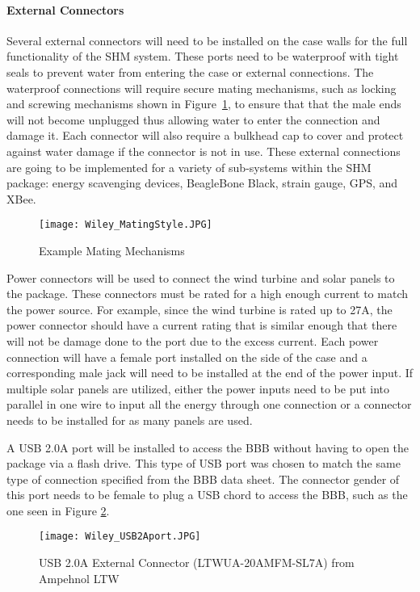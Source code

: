 \paragraph{External Connectors} 
Several external connectors will need to be installed on the case walls for the full functionality of the SHM system. These ports need to be waterproof
with tight seals to prevent water from entering the case or external connections. The waterproof connections will require secure mating mechanisms, such
as locking and screwing mechanisms shown in Figure~\ref{fig:BowChicaWowWow}, to ensure that that the male ends will not become unplugged thus allowing
water to enter the connection and damage it. Each connector will also require a bulkhead cap to cover and protect against water damage if the
connector is not in use. These external connections are going to be implemented for a variety of sub-systems within the SHM package: energy
scavenging devices, BeagleBone Black, strain gauge, GPS, and XBee.
\begin{figure}[h]
\centering
\texttt{[image: Wiley\_MatingStyle.JPG]}
\caption{\label{fig:BowChicaWowWow} Example Mating Mechanisms}
\end{figure}

Power connectors will be used to connect the wind turbine and solar panels to the package. These connectors must be rated for a high enough current to
match the power source. For example, since the wind turbine is rated up to 27A, the power connector should have a current rating that is similar enough
that there will not be damage done to the port due to the excess current. Each power connection will have a female port installed on the side of the
case and a corresponding male jack will need to be installed at the end of the power input. If multiple solar panels are utilized, either the power
inputs need to be put into parallel in one wire to input all the energy through one connection or a connector needs to be installed for as many panels
are used. 

A USB 2.0A port will be installed to access the BBB without having to open the package via a flash drive. This type of USB port was chosen to match the
same type of connection specified from the BBB data sheet. The connector gender of this port needs to be female to plug a USB chord to access the BBB,
such as the one seen in Figure \ref{fig:USB}. 
\begin{figure}[h]
\centering
\texttt{[image: Wiley\_USB2Aport.JPG]}
\caption{\label{fig:USB} USB 2.0A External Connector (LTWUA-20AMFM-SL7A) from Ampehnol LTW}
\end{figure}

